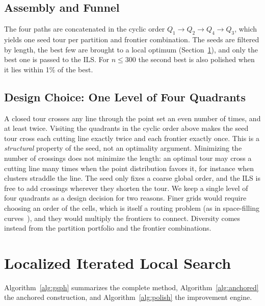 \documentclass[runningheads]{llncs}
\begin{document}
\subsection{Assembly and Funnel}

The four paths are concatenated in the cyclic order
$Q_1\!\to\!Q_2\!\to\!Q_4\!\to\!Q_3$, which yields one seed tour per
partition and frontier combination. The seeds are filtered by length,
the best few are brought to a local optimum (Section~\ref{sec:engine}),
and only the best one is passed to the ILS. For $n\le 300$ the second
best is also polished when it lies within 1\% of the best.

\subsection{Design Choice: One Level of Four Quadrants}
\label{sec:quadrants}

A closed tour crosses any line through the point set an even number of
times, and at least twice. Visiting the quadrants in the cyclic order
above makes the seed tour cross each cutting line exactly twice and each
frontier exactly once. This is a \emph{structural} property of the seed,
not an optimality argument. Minimizing the number of crossings does not
minimize the length: an optimal tour may cross a cutting line many times
when the point distribution favors it, for instance when clusters
straddle the line. The seed only fixes a coarse global order, and the
ILS is free to add crossings wherever they shorten the tour. We keep a
single level of four quadrants as a design decision for two reasons.
Finer grids would require choosing an order of the cells, which is
itself a routing problem (as in space-filling
curves~\cite{bartholdi1982spacefilling}), and they would multiply the
frontiers to connect. Diversity comes instead from the partition
portfolio and the frontier combinations.

\section{Localized Iterated Local Search}
\label{sec:engine}

Algorithm~\ref{alg:gsph} summarizes the complete method,
Algorithm~\ref{alg:anchored} the anchored construction, and
Algorithm~\ref{alg:polish} the improvement engine.
\end{document}
